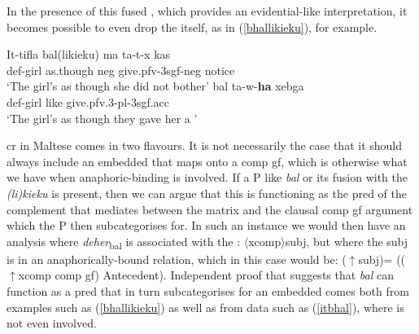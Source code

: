 \documentclass[output=paper]{LSP/langsci}
\begin{document}

In the presence of this fused , which provides an evidential-like interpretation, it becomes possible to even drop the  itself, as in (\ref{bhallikieku}), for example.%

\ea \label{bhallikieku}
\ea
\gll It-tifla b\textcrh al(likieku) ma ta-t-x kas\\
{\sc def}-girl as.though {\sc neg} give.{\sc pfv-3sgf-neg} notice\\
\glt `The girl's as though she did not bother'
\ex
{} b\textcrh al ta-w-{\bf{ha}} xebg\textcrh a\\
{\sc def-}girl like give.{\sc pfv.3-pl-3sgf.acc} \\
\glt `The girl's as though they gave her a '
\z
\z


{\sc cr} in Maltese comes in two flavours. It is not necessarily the case that it should always include an embedded  that maps onto a {\sc comp gf}, which is otherwise what we have when anaphoric-binding is involved. If a P like \emph{b\textcrh al} or its fusion with the  \emph{(li)kieku} is present, then we can argue that this is functioning as the {\sc pred} of the complement that mediates between the matrix  and the clausal {\sc comp gf} argument which the P then subcategorises for. In such an instance we would then have an analysis where \emph{deher}\textsubscript{b\textcrh al} is associated with the : $\langle${\sc xcomp}$\rangle${\sc subj}, but where the {\sc subj} is in an anaphorically-bound relation, which in this case would be: ($\uparrow${\sc subj})\textsigma = (($\uparrow${\sc xcomp comp gf}){\textsigma} Antecedent). Independent proof that suggests that \emph{b\textcrh al} can function as a {\sc pred} that in turn subcategorises for an embedded  comes both from examples such as (\ref{bhallikieku}) as well as from data such as (\ref{itbhal}), where  is not even involved. 
\end{document}
